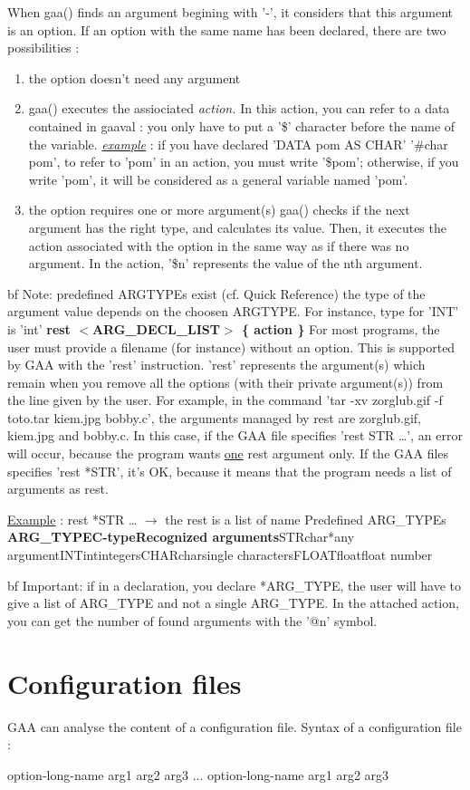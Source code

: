 \begin{itemize}
     When gaa() finds an argument begining with '-',
     it considers that this argument is an option. If an option with the same
     name has been declared, there are two possibilities :
      \begin{enumerate}
        \item the option doesn't need any argument\item  gaa() executes the assiociated {\it action. }In
          this action, you can refer to a data contained in gaaval : you only have
          to put a '\$' character before the name of the variable.
          {\it \underline{example}} : if you have declared 'DATA pom AS CHAR' '\#char
          pom', to refer to 'pom' in an action, you must write '\$pom'; otherwise,
          if you write 'pom', it will be considered as a general variable named 'pom'.
       \item 
	the option requires one or more argument(s)  gaa() checks if the next argument has the right
	type, and calculates its value. Then, it executes the action associated
	with the option in the same way as if there was no argument. In the action,
	'\$n' represents the value of the nth argument.
     \end{enumerate}
 {bf Note}:
predefined ARGTYPEs exist (cf. Quick Reference)
the type of the argument value depends on the choosen ARGTYPE. For instance,
type for 'INT' is 'int' {\bf rest $<$ARG\_DECL\_LIST$>$ \{ action \}}  For most programs, the user must provide a filename
(for instance) without an option. This is supported by GAA with the 'rest'
instruction.
 'rest' represents the argument(s) which remain when
you remove all the options (with their private argument(s)) from the line
given by the user.
 For example, in the command 'tar -xv zorglub.gif
-f toto.tar kiem.jpg bobby.c', the arguments managed by rest are zorglub.gif,
kiem.jpg and bobby.c. In this case, if the GAA file specifies 'rest STR
\ldots{}', an error will occur, because the program wants \underline{one} rest
argument only. If the GAA files specifies 'rest *STR', it's OK, because
it means that the program needs a list of arguments as rest.
\par  \underline{Example} :
 rest *STR \ldots{} $\rightarrow$ the rest is a list of name Predefined ARG\_TYPEs
{\bf ARG\_TYPE}{\bf C-type}{\bf Recognized arguments}STRchar*any argumentINTintintegersCHARcharsingle charactersFLOATfloatfloat number

{bf Important}: if in a declaration, you declare *ARG\_TYPE,
the user will have to give a list of ARG\_TYPE and not a single ARG\_TYPE.
In the attached action, you can get the number of found arguments with
the '@n' symbol.
\end{itemize}

\section{Configuration files}
GAA can analyse the content of a configuration file.
Syntax of a configuration file :
\par option-long-name arg1 arg2 arg3
...
option-long-name arg1 arg2 arg3

